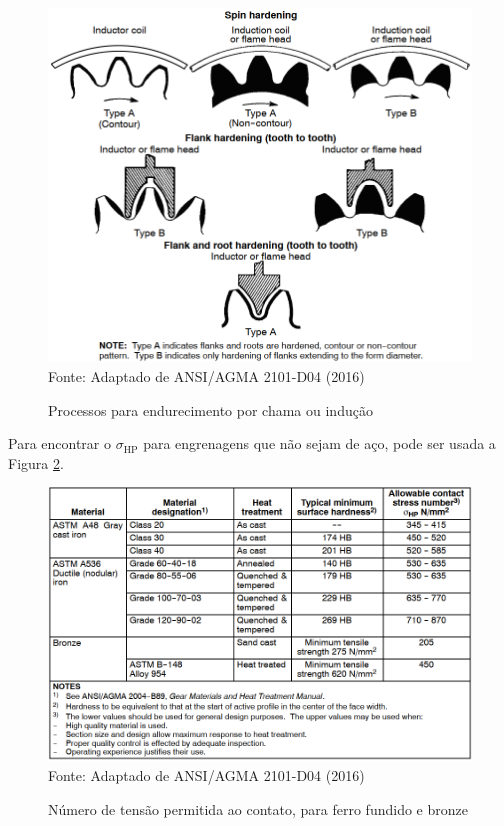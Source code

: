 \documentclass[12pt,a4paper]{article}
\begin{document}
\begin{figure}[!htb]
    \centering
    \caption{Processos para endurecimento por chama ou indução}
    \includegraphics[scale=0.45]{Imagens/Img22.png}\\
    {\footnotesize Fonte: Adaptado de ANSI/AGMA 2101-D04 (2016)}
    \label{fig:22}
\end{figure}

Para encontrar o $\sigma_{\text{HP}}$ para engrenagens que não sejam de aço, pode ser usada a Figura {\ref{fig:23}}.

\begin{figure}[!htb]
    \centering
    \caption{Número de tensão permitida ao contato, para ferro fundido e bronze}
    \includegraphics[scale=0.6]{Imagens/Img23.png}\\
    {\footnotesize Fonte: Adaptado de ANSI/AGMA 2101-D04 (2016)}
    \label{fig:23}
\end{figure}
\end{document}
